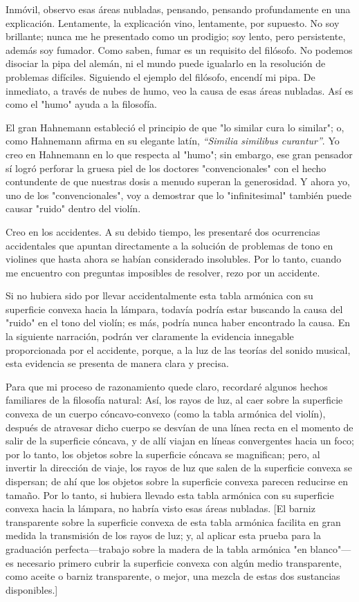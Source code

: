 \documentclass[12pt]{book}
\begin{document}
Inmóvil, observo esas áreas nubladas, pensando, pensando profundamente en una explicación. Lentamente, la explicación vino, lentamente, por supuesto. No soy brillante; nunca me he presentado como un prodigio; soy lento, pero persistente, además soy fumador. Como saben, fumar es un requisito del filósofo. No podemos disociar la pipa del alemán, ni el mundo puede igualarlo en la resolución de problemas difíciles. Siguiendo el ejemplo del filósofo, encendí mi pipa. De inmediato, a través de nubes de humo, veo la causa de esas áreas nubladas. Así es como el "humo" ayuda a la filosofía.

El gran Hahnemann estableció el principio de que "lo similar cura lo similar"; o, como Hahnemann afirma en su elegante latín, \textit{“Similia similibus curantur”}. Yo creo en Hahnemann en lo que respecta al "humo"; sin embargo, ese gran pensador sí logró perforar la gruesa piel de los doctores "convencionales" con el hecho contundente de que nuestras dosis a menudo superan la generosidad. Y ahora yo, uno de los "convencionales", voy a demostrar que lo "infinitesimal" también puede causar "ruido" dentro del violín.

Creo en los accidentes. A su debido tiempo, les presentaré dos ocurrencias accidentales que apuntan directamente a la solución de problemas de tono en violines que hasta ahora se habían considerado insolubles. Por lo tanto, cuando me encuentro con preguntas imposibles de resolver, rezo por un accidente.

Si no hubiera sido por llevar accidentalmente esta tabla armónica con su superficie convexa hacia la lámpara, todavía podría estar buscando la causa del "ruido" en el tono del violín; es más, podría nunca haber encontrado la causa. En la siguiente narración, podrán ver claramente la evidencia innegable proporcionada por el accidente, porque, a la luz de las teorías del sonido musical, esta evidencia se presenta de manera clara y precisa.

Para que mi proceso de razonamiento quede claro, recordaré algunos hechos familiares de la filosofía natural: Así, los rayos de luz, al caer sobre la superficie convexa de un cuerpo cóncavo-convexo (como la tabla armónica del violín), después de atravesar dicho cuerpo se desvían de una línea recta en el momento de salir de la superficie cóncava, y de allí viajan en líneas convergentes hacia un foco; por lo tanto, los objetos sobre la superficie cóncava se magnifican; pero, al invertir la dirección de viaje, los rayos de luz que salen de la superficie convexa se dispersan; de ahí que los objetos sobre la superficie convexa parecen reducirse en tamaño. Por lo tanto, si hubiera llevado esta tabla armónica con su superficie convexa hacia la lámpara, no habría visto esas áreas nubladas. [El barniz transparente sobre la superficie convexa de esta tabla armónica facilita en gran medida la transmisión de los rayos de luz; y, al aplicar esta prueba para la graduación perfecta—trabajo sobre la madera de la tabla armónica "en blanco"—es necesario primero cubrir la superficie convexa con algún medio transparente, como aceite o barniz transparente, o mejor, una mezcla de estas dos sustancias disponibles.]
\end{document}
